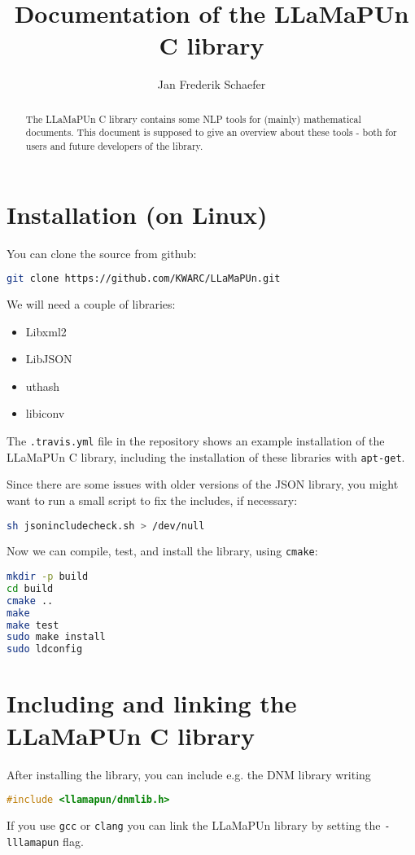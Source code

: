 \documentclass[12pt]{article}
\title{Documentation of the LLaMaPUn C library}
\author{Jan Frederik Schaefer}
\begin{document}
\maketitle

\begin{abstract}
The LLaMaPUn C library contains some NLP tools for (mainly) mathematical documents.
This document is supposed to give an overview about these tools - both for users and
future developers of the library.
\end{abstract}

\tableofcontents

\newpage

\section{Installation (on Linux)}

You can clone the source from github:
\begin{lstlisting}[language=bash]
git clone https://github.com/KWARC/LLaMaPUn.git
\end{lstlisting}
We will need a couple of libraries:
\begin{itemize}
\item Libxml2
\item LibJSON
\item uthash
\item libiconv
\end{itemize}
The \texttt{.travis.yml} file in the repository shows an example installation of the LLaMaPUn C library,
including the installation of these libraries with \texttt{apt-get}.

Since there are some issues with older versions of the JSON library,
you might want to run a small script to fix the includes, if necessary:
\begin{lstlisting}[language=bash]
sh jsonincludecheck.sh > /dev/null
\end{lstlisting}
Now we can compile, test, and install the library, using \texttt{cmake}:
\begin{lstlisting}[language=bash]
mkdir -p build
cd build
cmake ..
make
make test
sudo make install
sudo ldconfig
\end{lstlisting}



\section{Including and linking the LLaMaPUn C library}
After installing the library, you can include e.g. the DNM library writing
\begin{lstlisting}[language=C]
#include <llamapun/dnmlib.h>
\end{lstlisting}
If you use \texttt{gcc} or \texttt{clang} you can link the LLaMaPUn library by setting the
\texttt{-lllamapun} flag.
\end{document}
